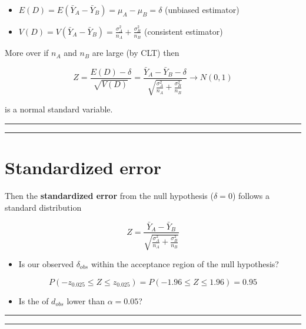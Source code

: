 \documentclass[
]{book}
\providecommand{\tightlist}{%
  \setlength{\itemsep}{0pt}\setlength{\parskip}{0pt}}
\begin{document}
\begin{itemize}
\item
  \(E(D)=E(\bar{Y}_A-\bar{Y}_B)=\mu_A-\mu_B=\delta\) (unbiased estimator)
\item
  \(V(D)=V(\bar{Y}_A-\bar{Y}_B)=\frac{\sigma^2_A}{n_A}+\frac{\sigma^2_B}{n_B}\) (consistent estimator)
\end{itemize}

More over if \(n_A\) and \(n_B\) are large (by CLT) then

\[Z=\frac{E(D)-\delta}{\sqrt{V(D)}}=\frac{\bar{Y}_A-\bar{Y}_B -\delta}{\sqrt{\frac{\sigma^2_A}{n_A}+\frac{\sigma^2_B}{n_B}}} \rightarrow N(0,1)\]

is a normal standard variable.

\begin{center}\rule{0.5\linewidth}{0.5pt}\end{center}

\begin{center}\rule{0.5\linewidth}{0.5pt}\end{center}

\hypertarget{standardized-error}{%
\section{Standardized error}\label{standardized-error}}

Then the \textbf{standardized error} from the null hypothesis (\(\delta=0\)) follows a standard distribution

\[Z=\frac{\bar{Y}_A-\bar{Y}_B}{\sqrt{\frac{\sigma^2_A}{n_A}+\frac{\sigma^2_B}{n_B}}}\]

\begin{itemize}
\tightlist
\item
  Is our observed \(\delta_{obs}\) within the acceptance region of the null hypothesis?
\end{itemize}

\[P(-z_{0.025} \leq Z \leq z_{0.025})=P(-1.96 \leq Z \leq 1.96)=0.95\]

\begin{itemize}
\tightlist
\item
  Is the of \(d_{obs}\) lower than \(\alpha=0.05\)?
\end{itemize}

\begin{center}\rule{0.5\linewidth}{0.5pt}\end{center}

\begin{center}\rule{0.5\linewidth}{0.5pt}\end{center}
\end{document}
